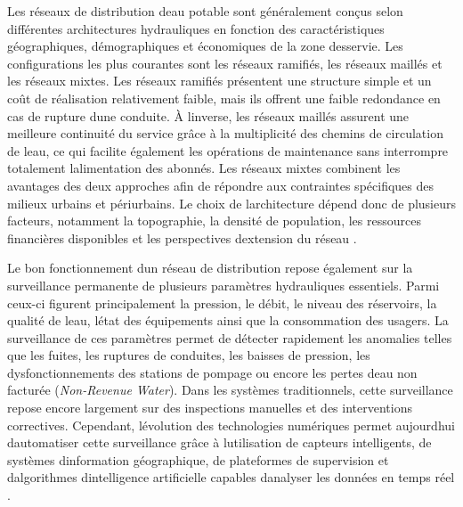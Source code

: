 \documentclass[12pt,a4paper,oneside]{report}
\begin{document}
Les réseaux de distribution d\textquotesingle eau potable sont
généralement conçus selon différentes architectures hydrauliques en
fonction des caractéristiques géographiques, démographiques et
économiques de la zone desservie. Les configurations les plus courantes
sont les réseaux ramifiés, les réseaux maillés et les réseaux mixtes.
Les réseaux ramifiés présentent une structure simple et un coût de
réalisation relativement faible, mais ils offrent une faible redondance
en cas de rupture d\textquotesingle une conduite. À
l\textquotesingle inverse, les réseaux maillés assurent une meilleure
continuité du service grâce à la multiplicité des chemins de circulation
de l\textquotesingle eau, ce qui facilite également les opérations de
maintenance sans interrompre totalement l\textquotesingle alimentation
des abonnés. Les réseaux mixtes combinent les avantages des deux
approches afin de répondre aux contraintes spécifiques des milieux
urbains et périurbains. Le choix de l\textquotesingle architecture
dépend donc de plusieurs facteurs, notamment la topographie, la densité
de population, les ressources financières disponibles et les
perspectives d\textquotesingle extension du réseau \cite{ref28}.

Le bon fonctionnement d\textquotesingle un réseau de distribution repose
également sur la surveillance permanente de plusieurs paramètres
hydrauliques essentiels. Parmi ceux-ci figurent principalement la
pression, le débit, le niveau des réservoirs, la qualité de
l\textquotesingle eau, l\textquotesingle état des équipements ainsi que
la consommation des usagers. La surveillance de ces paramètres permet de
détecter rapidement les anomalies telles que les fuites, les ruptures de
conduites, les baisses de pression, les dysfonctionnements des stations
de pompage ou encore les pertes d\textquotesingle eau non facturée
(\emph{Non-Revenue Water}). Dans les systèmes traditionnels, cette
surveillance repose encore largement sur des inspections manuelles et
des interventions correctives. Cependant, l\textquotesingle évolution
des technologies numériques permet aujourd\textquotesingle hui
d\textquotesingle automatiser cette surveillance grâce à
l\textquotesingle utilisation de capteurs intelligents, de systèmes
d\textquotesingle information géographique, de plateformes de
supervision et d\textquotesingle algorithmes
d\textquotesingle intelligence artificielle capables
d\textquotesingle analyser les données en temps réel \cite{ref20}.
\end{document}
